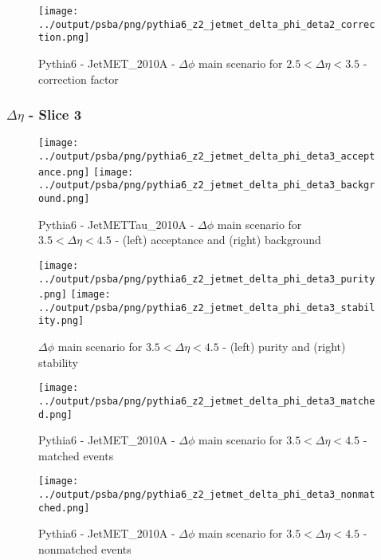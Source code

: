 \documentclass[11pt]{book}
\begin{document}
\begin{figure}[ht]
\centering
\texttt{[image: ../output/psba/png/pythia6\_z2\_jetmet\_delta\_phi\_deta2\_correction.png]}
\caption{Pythia6 - JetMET\_2010A - $\Delta\phi$ main scenario for $2.5 < \Delta\eta < 3.5$ - correction factor}
\label{fig:p6_jetmet_delta_phi_deta2_correction}
\end{figure}

\clearpage
\subsubsection{$\Delta\eta$ - Slice 3}

\begin{figure}[ht]
\centering
\texttt{[image: ../output/psba/png/pythia6\_z2\_jetmet\_delta\_phi\_deta3\_acceptance.png]}
\texttt{[image: ../output/psba/png/pythia6\_z2\_jetmet\_delta\_phi\_deta3\_background.png]}
\caption{Pythia6 - JetMETTau\_2010A - $\Delta\phi$ main scenario for $3.5 < \Delta\eta < 4.5$ - (left) acceptance and (right) background}
\label{fig:p6_jetmet_delta_phi_deta3_ab}
\end{figure}

\begin{figure}[ht]
\centering
\texttt{[image: ../output/psba/png/pythia6\_z2\_jetmet\_delta\_phi\_deta3\_purity.png]}
\texttt{[image: ../output/psba/png/pythia6\_z2\_jetmet\_delta\_phi\_deta3\_stability.png]}
\caption{$\Delta\phi$ main scenario for $3.5 < \Delta\eta < 4.5$ - (left) purity and (right) stability}
\label{fig:p6_jetmet_delta_phi_deta3_ps}
\end{figure}

\begin{figure}[ht]
\centering
\texttt{[image: ../output/psba/png/pythia6\_z2\_jetmet\_delta\_phi\_deta3\_matched.png]}
\caption{Pythia6 - JetMET\_2010A - $\Delta\phi$ main scenario for $3.5 < \Delta\eta < 4.5$ - matched events}
\label{fig:p6_jetmet_delta_phi_deta3_matched}
\end{figure}

\begin{figure}[ht]
\centering
\texttt{[image: ../output/psba/png/pythia6\_z2\_jetmet\_delta\_phi\_deta3\_nonmatched.png]}
\caption{Pythia6 - JetMET\_2010A - $\Delta\phi$ main scenario for $3.5 < \Delta\eta < 4.5$ - nonmatched events}
\label{fig:p6_jetmet_delta_phi_deta3_nonmatched}
\end{figure}
\end{document}
